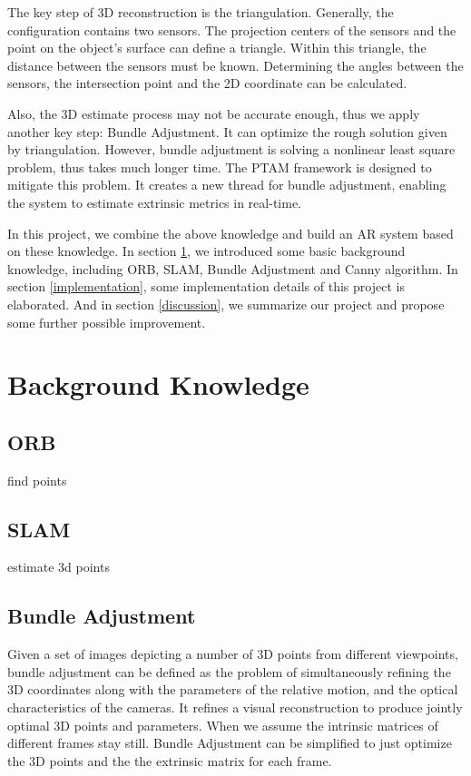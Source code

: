 \documentclass[paper=a4, fontsize=14pt]{scrartcl}
\numberwithin{equation}{section}                %
\numberwithin{figure}{section}                  %
\numberwithin{table}{section}                           %
\begin{document}
The key step of 3D reconstruction is the triangulation.
Generally, the configuration contains two sensors.
The projection centers of the sensors and the point on the object's surface can define a triangle.
Within this triangle, the distance between the sensors must be known.
Determining the angles between the sensors, the intersection point and the 2D coordinate can be calculated.

Also, the 3D estimate process may not be accurate enough, thus we apply another key step: Bundle Adjustment.
It can optimize the rough solution given by triangulation.
However, bundle adjustment is solving a nonlinear least square problem, thus takes much longer time.
The PTAM framework is designed to mitigate this problem.
It creates a new thread for bundle adjustment, enabling the system to estimate extrinsic metrics in real-time.

In this project, we combine the above knowledge and build an AR system based on these knowledge.
In section \ref{background}, we introduced some basic background knowledge, including ORB, SLAM, Bundle Adjustment and Canny algorithm.
In section \ref{implementation}, some implementation details of this project is elaborated.
And in section \ref{discussion}, we summarize our project and propose some further possible improvement.


\section{Background Knowledge}\label{background}

\subsection{ORB} find points

\subsection{SLAM} estimate 3d points

\subsection{Bundle Adjustment}
Given a set of images depicting a number of 3D points from different viewpoints, bundle adjustment can be defined as the problem of simultaneously refining the 3D coordinates along with the parameters of the relative motion, and the optical characteristics of the cameras.
It refines a visual reconstruction to produce jointly optimal 3D points and parameters.
When we assume the intrinsic matrices of different frames stay still. Bundle Adjustment can be simplified to just optimize the 3D points and the the extrinsic matrix for each frame. 
\end{document}
